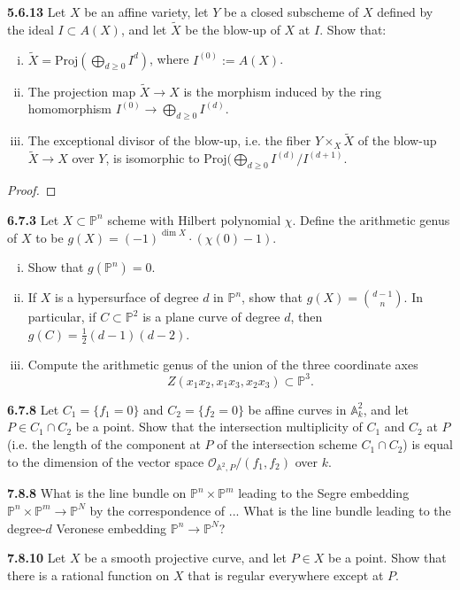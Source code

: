 \documentclass[11pt,letterpaper]{report}
\newcommand{\mcal}[1]{\mathcal{#1}}
\newcommand{\affine}{\mathbb{A}}
\newcommand{\projective}{\mathbb{P}}
\newcommand{\Proj}{\text{Proj}}
\begin{document}
\noindent\textbf{5.6.13}
Let $X$ be an affine variety, let $Y$ be a closed subscheme of $X$ defined by the ideal $I\subset A(X)$, and let $\tilde{X}$ be the blow-up of $X$ at $I$. Show that:
\begin{enumerate}[(i)]
	\item $\tilde{X} = \Proj(\bigoplus_{d\geq 0}I^d)$, where $I^{(0)}:= A(X)$.
	\item The projection map $\tilde{X}\to X$ is the morphism induced by the ring homomorphism $I^{(0)}\to \bigoplus_{d\geq 0}I^{(d)}$.
	\item The exceptional divisor of the blow-up, i.e. the fiber $Y\times_X\tilde{X}$ of the blow-up $\tilde{X}\to X$ over $Y$, is isomorphic to $\Proj(\bigoplus_{d\geq 0}I^{(d)}/I^{(d+1)}$.
\end{enumerate}
\begin{proof}
	
\end{proof}


\noindent\textbf{6.7.3}
Let $X\subset \projective^n$ scheme with Hilbert polynomial $\chi$. Define the arithmetic genus of $X$ to be $g(X) = (-1)^{\dim X}\cdot (\chi(0)-1)$.
\begin{enumerate}[(i)]
	\item Show that $g(\projective^n) = 0$.
	\item If $X$ is a hypersurface of degree $d$ in $\projective^n$, show that $g(X) = \binom{d-1}{n}$. In particular, if $C\subset \projective^2$ is a plane curve of degree $d$, then $g(C) = \frac{1}{2}(d-1)(d-2)$.
	\item Compute the arithmetic genus of the union of the three coordinate axes
	\[
	Z(x_1x_2, x_1x_3, x_2x_3)\subset \projective^3.
	\]
\end{enumerate}

\noindent\textbf{6.7.8}
Let $C_1 = \{f_1=0\}$ and $C_2 = \{f_2 = 0\}$ be affine curves in $\affine_k^2$, and let $P\in C_1\cap C_2$ be a point. Show that the intersection multiplicity of $C_1$ and $C_2$ at $P$ (i.e. the length of the component at $P$ of the intersection scheme $C_1\cap C_2$) is equal to the dimension of the vector space $\mcal{O}_{\affine^2, P}/(f_1, f_2)$ over $k$.

\noindent\textbf{7.8.8}
What is the line bundle on $\projective^n\times \projective^m$ leading to the Segre embedding $\projective^n\times \projective^m\to \projective^N$ by the correspondence of ... What is the line bundle leading to the degree-$d$ Veronese embedding $\projective^n\to \projective^N$?


\noindent\textbf{7.8.10}
Let $X$ be a smooth projective curve, and let $P\in X$ be a point. Show that there is a rational function on $X$ that is regular everywhere except at $P$.
\end{document}
